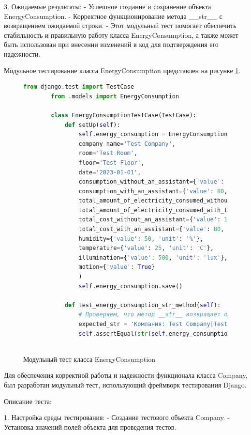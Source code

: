 3. Ожидаемые результаты:
- Успешное создание и сохранение объекта EnergyConsumption.
- Корректное функционирование метода \_\_str\_\_ с возвращением ожидаемой строки.
- Этот модульный тест помогает обеспечить стабильность и правильную работу класса EnergyConsumption, а также может быть использован при внесении изменений в код для подтверждения его надежности.


Модульное тестирование класса EnergyConsumption представлен на рисунке \ref{EnergyConsumption:image}.
\begin{figure}[ht]
	\begin{lstlisting}[language=Python]
		from django.test import TestCase
		from .models import EnergyConsumption
		
		class EnergyConsumptionTestCase(TestCase):
			def setUp(self):
				self.energy_consumption = EnergyConsumption(
				company_name='Test Company',
				room='Test Room',
				floor='Test Floor',
				date='2023-01-01',
				consumption_without_an_assistant={'value': 100, 'unit': 'kWh'},
				consumption_with_an_assistant={'value': 80, 'unit': 'kWh'},
				total_amount_of_electricity_consumed_without_an_assistant=100,
				total_amount_of_electricity_consumed_with_the_assistant=80,
				total_cost_without_an_assistant={'value': 100, 'currency': 'USD'},
				total_cost_with_an_assistant={'value': 80, 'currency': 'USD'},
				humidity={'value': 50, 'unit': '%'},
				temperature={'value': 25, 'unit': 'C'},
				illumination={'value': 500, 'unit': 'lux'},
				motion={'value': True}
				)
				self.energy_consumption.save()
				
			def test_energy_consumption_str_method(self):
				# Проверяем, что метод __str__ возвращает ожидаемую строку
				expected_str = 'Компания: Test Company|Test Room, Дата: 2023-01-01'
				self.assertEqual(str(self.energy_consumption), expected_str)
				
	\end{lstlisting}  
	
	\caption{Модульный тест класса EnergyConsumption}
	\label{EnergyConsumption:image}
\end{figure}

\newpage

Для обеспечения корректной работы и надежности функционала класса Company, был разработан модульный тест, использующий фреймворк тестирования Django.

Описание теста:

1. Настройка среды тестирования:
- Создание тестового объекта Company.
- Установка значений полей объекта для проведения тестов.

